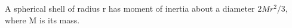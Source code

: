  A spherical shell of radius r has moment of inertia about a diameter $2Mr^{2}/3,$  where M is its mass.
